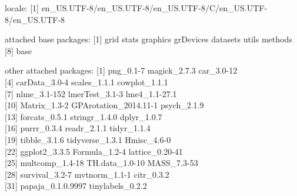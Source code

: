 \documentclass[
  english,
  man,floatsintext]{apa7}
\begin{document}
locale:
{[}1{]} en\_US.UTF-8/en\_US.UTF-8/en\_US.UTF-8/C/en\_US.UTF-8/en\_US.UTF-8

attached base packages:
{[}1{]} grid stats graphics grDevices datasets utils methods\\
{[}8{]} base

other attached packages:
{[}1{]} png\_0.1-7 magick\_2.7.3 car\_3.0-12\\
{[}4{]} carData\_3.0-4 scales\_1.1.1 cowplot\_1.1.1\\
{[}7{]} nlme\_3.1-152 lmerTest\_3.1-3 lme4\_1.1-27.1\\
{[}10{]} Matrix\_1.3-2 GPArotation\_2014.11-1 psych\_2.1.9\\
{[}13{]} forcats\_0.5.1 stringr\_1.4.0 dplyr\_1.0.7\\
{[}16{]} purrr\_0.3.4 readr\_2.1.1 tidyr\_1.1.4\\
{[}19{]} tibble\_3.1.6 tidyverse\_1.3.1 Hmisc\_4.6-0\\
{[}22{]} ggplot2\_3.3.5 Formula\_1.2-4 lattice\_0.20-41\\
{[}25{]} multcomp\_1.4-18 TH.data\_1.0-10 MASS\_7.3-53\\
{[}28{]} survival\_3.2-7 mvtnorm\_1.1-1 citr\_0.3.2\\
{[}31{]} papaja\_0.1.0.9997 tinylabels\_0.2.2
\end{document}
